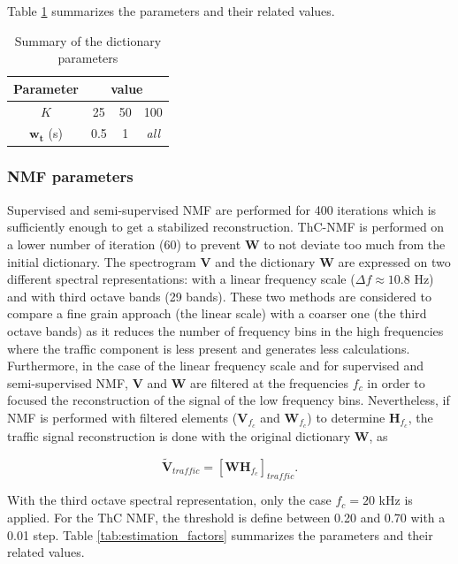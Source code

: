 \documentclass[twocolumn,a4paper,10pt]{article}
\begin{document}
Table \ref{tab:dictionary_factors} summarizes the parameters and their related values.

\begin{table}[h]
\centering
\begin{tabular}{cccc}
Parameter &  \multicolumn{3}{c}{value}\\ \hline
$K$ & 25  & 50 & 100 \\ \hline
$\mathbf{w_t}$ (s)& 0.5 & 1  & \textit{all}
\end{tabular}
\caption{Summary of the dictionary parameters}
\label{tab:dictionary_factors}
\end{table}

\subsubsection{NMF parameters}

Supervised and semi-supervised NMF are performed for 400 iterations which is sufficiently enough to get a stabilized reconstruction. ThC-NMF is performed on a lower number of iteration (60) to prevent $\mathbf{W}$ to not deviate too much from the initial dictionary. The spectrogram $\mathbf{V}$ and the dictionary $\mathbf{W}$ are expressed on two different spectral representations: with a linear frequency scale ($\Delta f \approx 10.8$ Hz) and with third octave bands (29 bands). These two methods are considered to compare a fine grain approach (the linear scale) with a coarser one (the third octave bands) as it reduces the number of frequency bins in the high frequencies where the traffic component is less present and generates less calculations. Furthermore, in the case of the linear frequency scale and for supervised and semi-supervised NMF, $\mathbf{V}$ and $\mathbf{W}$ are filtered at the frequencies $f_c$ in order to focused the reconstruction of the signal of the low frequency bins. Nevertheless, if NMF is performed with filtered elements ($\mathbf{V}_{f_c}$ and $\mathbf{W}_{f_c}$) to determine $\mathbf{H}_{f_c}$, the traffic signal reconstruction is done with the original dictionary $\mathbf{W}$, as

\begin{equation}
\mathbf{\tilde{V}}_{traffic} = \left[\mathbf{WH}_{f_c}\right]_{traffic}.
\end{equation}

With the third octave spectral representation, only the case $f_c = 20$ kHz is applied. For the ThC NMF, the threshold is define between 0.20 and 0.70 with a 0.01 step. Table \ref{tab:estimation_factors} summarizes the parameters and their related values.
\end{document}
